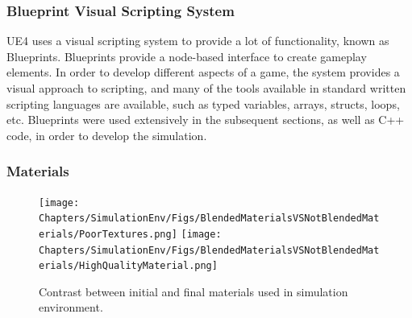 \subsubsection{Blueprint Visual Scripting System}
UE4 uses a visual scripting system to provide a lot of functionality, known as Blueprints. Blueprints provide a node-based interface to create gameplay elements. In order to develop different aspects of a game, the system provides a visual approach to scripting, and many of the tools available in standard written scripting languages are available, such as typed variables, arrays, structs, loops, etc. Blueprints were used extensively in the subsequent sections, as well as C++ code, in order to develop the simulation.


\subsubsection{Materials}


\begin{figure}
    \centering
    \texttt{[image: Chapters/SimulationEnv/Figs/BlendedMaterialsVSNotBlendedMaterials/PoorTextures.png]}
    \label{fig:PoorTextures}
    \texttt{[image: Chapters/SimulationEnv/Figs/BlendedMaterialsVSNotBlendedMaterials/HighQualityMaterial.png]}
    \label{fig:GoodTextures}
    \caption{Contrast between initial and final materials used in simulation environment.}
\end{figure}

